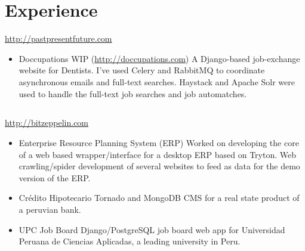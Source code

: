 \documentclass[11pt,a4paper,english]{moderncv}
\begin{document}
\maketitle

\section{Experience}
{
\url{http://pastpresentfuture.com}
\begin{itemize}
    \item Doccupations
        \newline
        WIP (\url{http://doccupations.com})
        \newline
        A Django-based job-exchange website for Dentists. I've used Celery and RabbitMQ to coordinate asynchronous emails and full-text searches. Haystack and Apache Solr were used to handle the full-text job searches and job automatches.
\end{itemize}
}

\subsection{}

{
\url{http://bitzeppelin.com}
\newline{}
\begin{itemize}
    \item Enterprise Resource Planning System (ERP)
        \newline{}
	Worked on developing the core of a web based wrapper/interface for a desktop ERP based on Tryton. Web crawling/spider development of several websites to feed as data for the demo version of the ERP.
    \item Crédito Hipotecario
        \newline{}
        Tornado and MongoDB CMS for a real state product of a peruvian bank.
    \item UPC Job Board
        \newline{}
        Django/PostgreSQL job board web app for Universidad Peruana de Ciencias Aplicadas, a leading university in Peru.
\end{itemize}
}

\subsection{}
\end{document}
